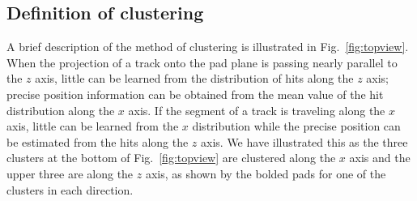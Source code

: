 \documentclass[review,number,sort&compress]{elsarticle}
\begin{document}
\subsection{Definition of clustering}
A brief description of the method of clustering is illustrated in Fig.~\ref{fig:topview}. When the projection of a track onto the pad plane is passing nearly parallel to the $z$ axis, little can be learned from the distribution of hits along the $z$ axis; precise position information can be obtained from the mean value of the hit distribution along the $x$ axis. If the segment of a track is traveling along the $x$ axis, little can be learned from the $x$ distribution while the precise position can be estimated from the hits along the $z$ axis. We have illustrated this as the three clusters at the bottom of Fig.~\ref{fig:topview} are clustered along the $x$ axis and the upper three are along the $z$ axis, as shown by the bolded pads for one of the clusters in each direction.
\end{document}

